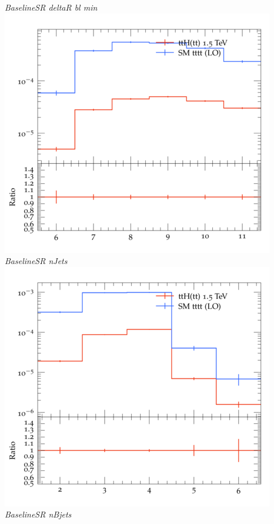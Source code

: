 \documentclass{beamer}
\begin{document}
\begin{frame}
\begin{columns}
\textit{\small BaselineSR deltaR bl min}
\includegraphics[width=\textwidth]{../plots/ttH_1500/tttt_ttH_1LOS/BaselineSR_nJets.png}\\
\textit{\small BaselineSR nJets}
\includegraphics[width=\textwidth]{../plots/ttH_1500/tttt_ttH_1LOS/BaselineSR_nBjets.png}\\
\textit{\small BaselineSR nBjets}
\end{columns}
\end{frame}
\end{document}
